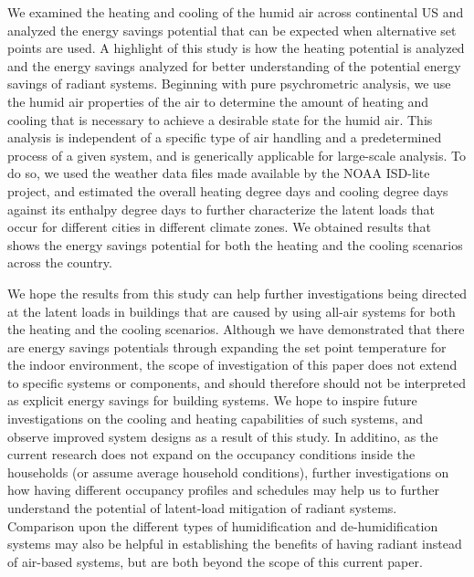 We examined the heating and cooling of the humid air across continental US and analyzed the energy savings potential that can be expected when alternative set points are used. A highlight of this study is how the heating potential is analyzed and the energy savings analyzed for better understanding of the potential energy savings of radiant systems. Beginning with pure psychrometric analysis, we use the humid air properties of the air to determine the amount of heating and cooling that is necessary to achieve a desirable state for the humid air. This analysis is independent of a specific type of air handling and a predetermined process of a given system, and is generically applicable for large-scale analysis. To do so, we used the weather data files made available by the NOAA ISD-lite project, and estimated the overall heating degree days and cooling degree days against its enthalpy degree days to further characterize the latent loads that occur for different cities in different climate zones. We obtained results that shows the energy savings potential for both the heating and the cooling scenarios across the country.

We hope the results from this study can help further investigations being directed at the latent loads in buildings that are caused by using all-air systems for both the heating and the cooling scenarios. Although we have demonstrated that there are energy savings potentials through expanding the set point temperature for the indoor environment, the scope of investigation of this paper does not extend to specific systems or components, and should therefore should not be interpreted as explicit energy savings for building systems. We hope to inspire future investigations on the cooling and heating capabilities of such systems, and observe improved system designs as a result of this study. In additino, as the current research does not expand on the occupancy conditions inside the households (or assume average household conditions), further investigations on how having different occupancy profiles and schedules may help us to further understand the potential of latent-load mitigation of radiant systems. Comparison upon the different types of humidification and de-humidification systems may also be helpful in establishing the benefits of having radiant instead of air-based systems, but are both beyond the scope of this current paper.